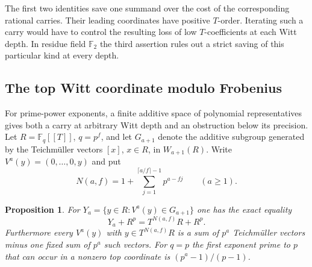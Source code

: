 \documentclass[11pt,letterpaper]{article}
\newtheorem{proposition}[proposition]{Proposition}
\theoremstyle{definition}
\numberwithin{equation}{section}
\begin{document}
The first two identities save one summand over the cost of the
corresponding rational carries. Their leading coordinates have
positive $T$-order. Iterating such a carry would have to control
the resulting loss of low $T$-coefficients at each Witt depth.
In residue field $\mathbb F_2$ the third assertion rules out a
strict saving of this particular kind at every depth.

\subsection{The top Witt coordinate modulo Frobenius}
\label{sec:witt-top-functions}
For prime-power exponents, a finite additive space of polynomial
representatives gives both a carry at arbitrary Witt depth and an
obstruction below its precision. Let $R=\mathbb F_q[[T]]$, $q=p^f$,
and let $G_{a+1}$ denote the additive subgroup generated by the
Teichm\"uller vectors $[x]$, $x\in R$, in $W_{a+1}(R)$.
Write $V^a(y)=(0,\ldots,0,y)$ and put
\[
 N(a,f)=1+\sum_{j=1}^{\lceil a/f\rceil-1}p^{a-fj}
                         \qquad(a\ge1).
\]
\begin{proposition}\label{prop:witt-top-functions}
For $Y_a=\{y\in R: V^a(y)\in G_{a+1}\}$ one has the exact equality
\[
                Y_a+R^p=T^{N(a,f)}R+R^p .
\]
Furthermore every $V^a(y)$ with $y\in T^{N(a,f)}R$ is a sum of
$p^a$ Teichm\"uller vectors minus one fixed sum of $p^a$ such vectors.
For $q=p$ the first exponent prime to $p$ that can occur in a nonzero
top coordinate is $(p^a-1)/(p-1)$.
\end{proposition}
\end{document}
